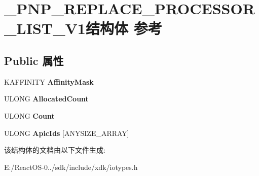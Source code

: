 \hypertarget{struct___p_n_p___r_e_p_l_a_c_e___p_r_o_c_e_s_s_o_r___l_i_s_t___v1}{}\section{\+\_\+\+P\+N\+P\+\_\+\+R\+E\+P\+L\+A\+C\+E\+\_\+\+P\+R\+O\+C\+E\+S\+S\+O\+R\+\_\+\+L\+I\+S\+T\+\_\+\+V1结构体 参考}
\label{struct___p_n_p___r_e_p_l_a_c_e___p_r_o_c_e_s_s_o_r___l_i_s_t___v1}
\subsection*{Public 属性}
\begin{DoxyCompactItemize}
\item 
\mbox{\label{struct___p_n_p___r_e_p_l_a_c_e___p_r_o_c_e_s_s_o_r___l_i_s_t___v1_a77739a972fe6559962899d5441f09cf5}} 
K\+A\+F\+F\+I\+N\+I\+TY {\bfseries Affinity\+Mask}
\item 
\mbox{\label{struct___p_n_p___r_e_p_l_a_c_e___p_r_o_c_e_s_s_o_r___l_i_s_t___v1_ab10c090946e0bdb4c4dc18da6bef1e3c}} 
U\+L\+O\+NG {\bfseries Allocated\+Count}
\item 
\mbox{\label{struct___p_n_p___r_e_p_l_a_c_e___p_r_o_c_e_s_s_o_r___l_i_s_t___v1_a4d1de24b79a7adf5ff7933a4c56c8364}} 
U\+L\+O\+NG {\bfseries Count}
\item 
\mbox{\label{struct___p_n_p___r_e_p_l_a_c_e___p_r_o_c_e_s_s_o_r___l_i_s_t___v1_a5a0eff4f62250990782799013e03bf93}} 
U\+L\+O\+NG {\bfseries Apic\+Ids} \mbox{[}A\+N\+Y\+S\+I\+Z\+E\+\_\+\+A\+R\+R\+AY\mbox{]}
\end{DoxyCompactItemize}


该结构体的文档由以下文件生成\+:\begin{DoxyCompactItemize}
\item 
E\+:/\+React\+O\+S-\/0../sdk/include/xdk/iotypes.\+h\end{DoxyCompactItemize}
